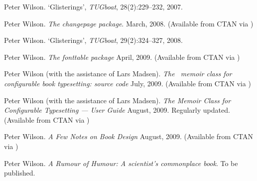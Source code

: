 \begin{thebibliography}{GMS94A}
\begin{comment}
\bibitem[Wil07d]{MEMADD}
Peter Wilson.
  \newblock \emph{ADDENDUM: The Memoir Class for Configurable
    Typesetting --- User Guide} 
  \newblock November, 2007.
  \newblock (Available from CTAN in 
            \url{/macros/latex/contrib/memoir})
\end{comment}
          
Peter Wilson.
  \newblock `Glisterings', \emph{TUGboat}, 28(2):229--232, 2007.

\begin{comment}
\bibitem[Wil07f]{TUGKEYNOTE07}
Peter Wilson.
  \newblock `Between then and now --- A meandering memoir', 
  \newblock \emph{TUGboat}, 28(3):280--298, 2007.
\end{comment}

  Peter Wilson.
  \newblock \emph{The changepage package}.
  \newblock March, 2008.
  \newblock (Available from CTAN via
            )

Peter Wilson.
  \newblock `Glisterings', \emph{TUGboat}, 29(2):324--327, 2008.

  Peter Wilson.
  \newblock \emph{The fonttable package}
  \newblock April, 2009.
  \newblock (Available from CTAN via 
            )

Peter Wilson (with the assistance of Lars Madsen).
  \newblock \emph{The \ltx\ memoir class for configurable book
    typesetting: source code} 
  \newblock July, 2009.
  \newblock (Available from CTAN via 
            )

Peter Wilson (with the assistance of Lars Madsen).
  \newblock \emph{The Memoir Class for Configurable Typesetting ---
    User Guide} 
  \newblock August, 2009. Regularly updated.
  \newblock (Available from CTAN via 
            )

  Peter Wilson.
  \newblock \emph{A Few Notes on Book Design}
  \newblock August, 2009.
  \newblock (Available from CTAN via
            )


Peter Wilson.
\newblock \emph{A Rumour of Humour: A scientist's commonplace book}.
\newblock To be published.



\end{thebibliography}
